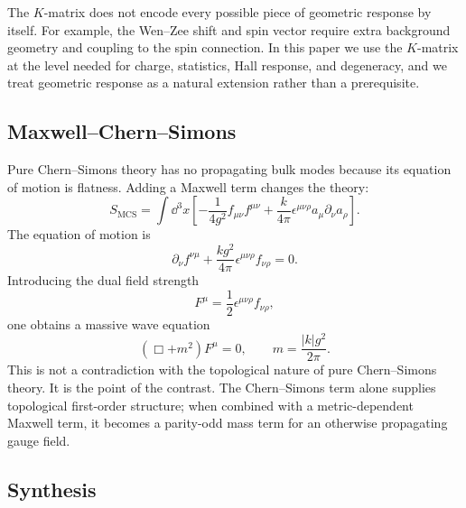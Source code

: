 The $K$-matrix does not encode every possible piece of geometric response by itself. For example, the Wen--Zee shift and spin vector require extra background geometry and coupling to the spin connection. In this paper we use the $K$-matrix at the level needed for charge, statistics, Hall response, and degeneracy, and we treat geometric response as a natural extension rather than a prerequisite.


\subsection{Maxwell--Chern--Simons}
\label{subsec:maxwell-cs-contrast}

Pure Chern--Simons theory has no propagating bulk modes because its equation of motion is flatness. Adding a Maxwell term changes the theory:
\begin{equation}
  S_{\mathrm{MCS}}
  =
  \int\dd^3x\left[
  -\frac{1}{4g^2}f_{\mu\nu}f^{\mu\nu}
  +
  \frac{k}{4\pi}\epsilon^{\mu\nu\rho}a_\mu\partial_\nu a_\rho
  \right].
  \label{eq:anomaly-mcs-action}
\end{equation}
The equation of motion is
\begin{equation}
  \partial_\nu f^{\nu\mu}
  +
  \frac{k g^2}{4\pi}\epsilon^{\mu\nu\rho}f_{\nu\rho}
  =
  0.
  \label{eq:anomaly-mcs-eom}
\end{equation}
Introducing the dual field strength
\begin{equation}
  F^\mu=\frac12\epsilon^{\mu\nu\rho}f_{\nu\rho},
  \label{eq:anomaly-dual-field}
\end{equation}
one obtains a massive wave equation
\begin{equation}
  (\Box+m^2)F^\mu=0,
  \qquad
  m=\frac{|k|g^2}{2\pi}.
  \label{eq:anomaly-topological-mass}
\end{equation}
This is not a contradiction with the topological nature of pure Chern--Simons theory. It is the point of the contrast. The Chern--Simons term alone supplies topological first-order structure; when combined with a metric-dependent Maxwell term, it becomes a parity-odd mass term for an otherwise propagating gauge field.

\subsection{Synthesis}
\label{subsec:anomaly-response-synthesis}

